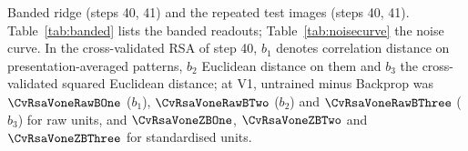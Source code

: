 Banded ridge (steps 40, 41) and the repeated test images (steps 40, 41). Table~\ref{tab:banded} lists the
banded readouts; Table~\ref{tab:noisecurve} the noise curve. In the cross-validated RSA of step 40, $b_1$
denotes correlation distance on presentation-averaged patterns, $b_2$ Euclidean distance on them and $b_3$
the cross-validated squared Euclidean distance; at V1, untrained minus Backprop was
$\CvRsaVoneRawBOne$ ($b_1$), $\CvRsaVoneRawBTwo$ ($b_2$) and $\CvRsaVoneRawBThree$ ($b_3$) for raw units, and
$\CvRsaVoneZBOne$, $\CvRsaVoneZBTwo$ and $\CvRsaVoneZBThree$ for standardised units.



